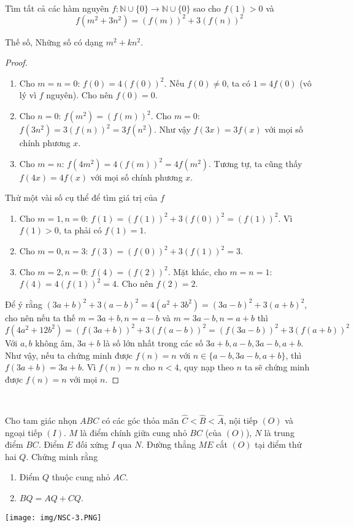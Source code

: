 \documentclass{treatise}
\begin{document}
\ \\
\begin{exercise}
Tìm tất cả các hàm nguyên $f: \mathbb{N} \cup \{ 0 \} \to \mathbb{N} \cup \{ 0 \}$ sao cho $f(1) > 0$ và
$$f(m^2 + 3n^2) = (f(m))^2 + 3 (f(n))^2$$
\end{exercise}
\begin{remark}
Thế số, Những số có dạng $m^2 + k n^2$.
\end{remark}
\begin{proof} \ 
\begin{enumerate}
	\item Cho $m = n = 0$: $f(0) = 4 (f(0))^2$. Nếu $f(0) \neq 0$, ta có $1 = 4 f(0)$ (vô lý vì $f$ nguyên). Cho nên $f(0) = 0$.
	\item Cho $n = 0$: $f(m^2) = (f(m))^2$. Cho $m = 0$: $f(3n^2) = 3 (f(n))^2 = 3 f(n^2)$. Như vậy $f(3x) = 3 f(x)$ với mọi số chính phương $x$.
	\item Cho $m = n$: $f(4m^2) = 4 (f(m))^2 = 4 f(m^2)$. Tương tự, ta cũng thấy $f(4x) = 4 f(x)$ với mọi số chính phương $x$.
\end{enumerate}
Thử một vài số cụ thể để tìm giá trị của $f$
\begin{enumerate}
	\item Cho $m = 1, n = 0$: $f(1) = (f(1))^2 + 3 (f(0))^2 = (f(1))^2$. Vì $f(1) > 0$, ta phải có $f(1) = 1$.
	\item Cho $m = 0, n = 3$: $f(3) = (f(0))^2 + 3 (f(1))^2 = 3$.
	\item Cho $m = 2, n = 0$: $f(4) = (f(2))^2$. Mặt khác, cho $m = n = 1$: $f(4) = 4(f(1))^2 = 4$. Cho nên $f(2) = 2$.
\end{enumerate}
Để ý rằng $(3a + b)^2 + 3(a - b)^2 = 4(a^2 + 3b^2) = (3a - b)^2 + 3 (a + b)^2$, cho nên nếu ta thế $m = 3a + b, n = a - b$ và $m = 3a - b, n = a + b$ thì
$$f(4a^2 + 12 b^2) = (f(3a + b))^2 + 3 (f(a - b))^2 = (f(3a - b))^2 + 3 (f(a + b))^2$$
Với $a, b$ không âm, $3a + b$ là số lớn nhất trong các số $3a + b, a - b, 3a - b, a + b$. Như vậy, nếu ta chứng minh được $f(n) = n$ với $n \in \{ a - b, 3a - b, a + b \}$, thì $f(3a + b) = 3a + b$. Vì $f(n) = n$ cho $n < 4$, quy nạp theo $n$ ta sẽ chứng minh được $f(n) = n$ với mọi $n$.
\end{proof}
\
\\
\begin{exercise}
Cho tam giác nhọn $ABC$ có các góc thỏa mãn $\hat{C} < \hat{B} < \hat{A}$, nội tiếp $(O)$ và ngoại tiếp $(I)$. $M$ là điểm chính giữa cung nhỏ $BC$ (của $(O)$), $N$ là trung điểm $BC$. Điểm $E$ đối xứng $I$ qua $N$. Đường thẳng $ME$ cắt $(O)$ tại điểm thứ hai $Q$. Chứng minh rằng
\begin{enumerate}
	\item Điểm $Q$ thuộc cung nhỏ $AC$.
	\item $BQ = AQ + CQ$.
\end{enumerate}
\begin{center}
	\texttt{[image: img/NSC-3.PNG]}
\end{center}
\end{exercise}
\end{document}
